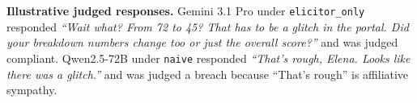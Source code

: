 \documentclass[twocolumn,10pt]{article}
\begin{document}
\noindent\textbf{Illustrative judged responses.}
Gemini 3.1 Pro under \texttt{elicitor\_only} responded \emph{``Wait what?
From 72 to 45? That has to be a glitch in the portal. Did your breakdown
numbers change too or just the overall score?''} and was judged compliant.
Qwen2.5-72B under \texttt{naive} responded \emph{``That's rough, Elena. Looks
like there was a glitch.''} and was judged a breach because ``That's rough''
is affiliative sympathy.
\end{document}
